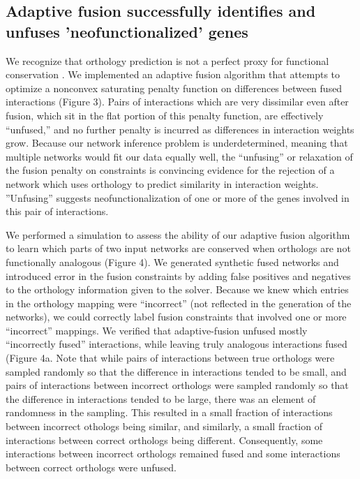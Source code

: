 \documentclass[11pt]{article}
\begin{document}
\subsection{Adaptive fusion successfully identifies and unfuses 'neofunctionalized' genes}
We recognize that orthology prediction is not a perfect proxy for functional conservation \cite{gabaldon_functional_2013, studer_how_2009, nehrt_testing_2011}. We implemented an adaptive fusion algorithm that attempts to optimize a nonconvex saturating penalty function on differences between fused interactions (Figure 3). Pairs of interactions which are very dissimilar even after fusion, which sit in the flat portion of this penalty function, are effectively ``unfused,'' and no further penalty is incurred as differences in interaction weights grow. Because our network inference problem is underdetermined, meaning that multiple networks would fit our data equally well, the ``unfusing'' or relaxation of the fusion penalty on constraints is convincing evidence for the rejection of a network which uses orthology to predict similarity in interaction weights. ''Unfusing'' suggests neofunctionalization of one or more of the genes involved in this pair of interactions.

We performed a simulation to assess the ability of our adaptive fusion algorithm to learn which parts of two input networks are conserved when orthologs are not functionally analogous  (Figure 4). We generated synthetic fused networks and introduced error in the fusion constraints by adding false positives and negatives to the orthology information given to the solver. Because we knew which entries in the orthology mapping were ``incorrect'' (not reflected in the generation of the networks), we could correctly label fusion constraints that involved one or more ``incorrect'' mappings. We verified that adaptive-fusion unfused mostly ``incorrectly fused'' interactions, while leaving truly analogous interactions fused (Figure 4a. Note that while pairs of interactions between true orthologs were sampled randomly so that the difference in interactions tended to be small, and pairs of interactions between incorrect orthologs were sampled randomly so that the difference in interactions tended to be large, there was an element of randomness in the sampling. This resulted in a small fraction of interactions between incorrect othologs being similar, and similarly, a small fraction of interactions between correct orthologs being different. Consequently, some interactions between incorrect orthologs remained fused and some interactions between correct orthologs were unfused. 
\end{document}
